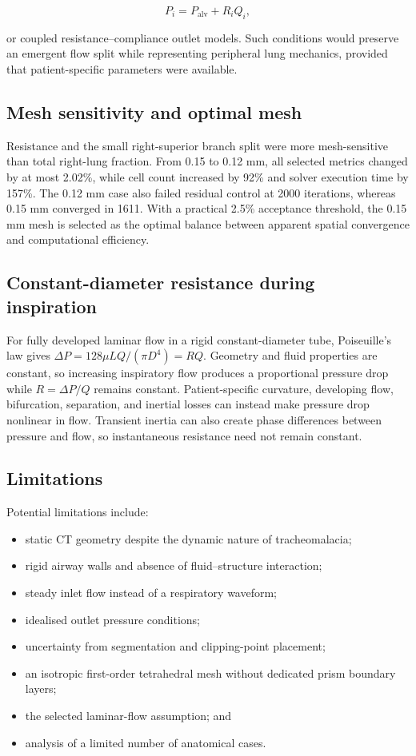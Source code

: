 \documentclass[11pt,a4paper]{article}
\begin{document}
\begin{equation}
  P_i = P_{\mathrm{alv}} + R_i Q_i,
\end{equation}

or coupled resistance--compliance outlet models. Such conditions would preserve
an emergent flow split while representing peripheral lung mechanics, provided
that patient-specific parameters were available.

\subsection{Mesh sensitivity and optimal mesh}

Resistance and the small right-superior branch split were more mesh-sensitive
than total right-lung fraction. From 0.15 to 0.12 mm, all selected metrics changed
by at most 2.02\%, while cell count increased by 92\% and solver execution time
by 157\%. The 0.12 mm case also failed residual control at 2000 iterations,
whereas 0.15 mm converged in 1611. With a practical 2.5\% acceptance threshold,
the 0.15 mm mesh is selected as the optimal balance between apparent spatial
convergence and computational efficiency.

\subsection{Constant-diameter resistance during inspiration}

For fully developed laminar flow in a rigid constant-diameter tube,
Poiseuille's law gives $\Delta P=128\mu LQ/(\pi D^4)=RQ$. Geometry and fluid
properties are constant, so increasing inspiratory flow produces a proportional
pressure drop while $R=\Delta P/Q$ remains constant. Patient-specific curvature,
developing flow, bifurcation, separation, and inertial losses can instead make
pressure drop nonlinear in flow. Transient inertia can also create phase
differences between pressure and flow, so instantaneous resistance need not
remain constant.

\subsection{Limitations}

Potential limitations include:

\begin{itemize}
  \item static CT geometry despite the dynamic nature of tracheomalacia;
  \item rigid airway walls and absence of fluid--structure interaction;
  \item steady inlet flow instead of a respiratory waveform;
  \item idealised outlet pressure conditions;
  \item uncertainty from segmentation and clipping-point placement;
  \item an isotropic first-order tetrahedral mesh without dedicated prism
        boundary layers;
  \item the selected laminar-flow assumption; and
  \item analysis of a limited number of anatomical cases.
\end{itemize}
\end{document}
